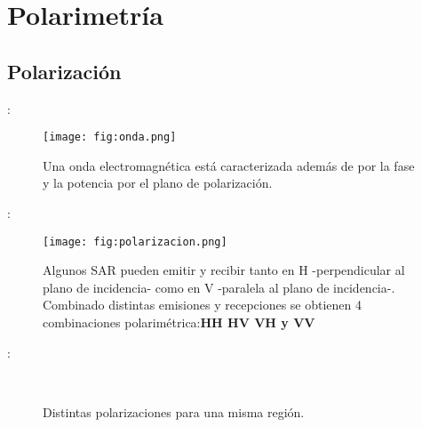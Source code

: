 \section{Polarimetría}
\subsection{Polarización}
\begin{frame}{\secname : \subsecname}
  \begin{figure}
    \centering
    \texttt{[image: fig:onda.png]}
    \caption{Una onda electromagnética está caracterizada además de por la fase y la potencia por el plano de polarización.}
    \label{}
  \end{figure}
\end{frame}

\begin{frame}{\secname : \subsecname}
  \begin{figure}
    \centering
    \texttt{[image: fig:polarizacion.png]}
    \caption{Algunos SAR pueden emitir y recibir tanto en H -perpendicular al plano de incidencia- como en V -paralela al plano de incidencia-. Combinado distintas emisiones y recepciones se obtienen 4 combinaciones polarimétrica:{\bf HH HV VH y VV}}
    \label{}
  \end{figure}
\end{frame}

\begin{frame}{\secname : \subsecname}
  \begin{figure}
    \centering
    \hspace{1cm}
    \\
    \hspace{1cm}
    \caption{Distintas polarizaciones para una misma región.}
  \end{figure}
\end{frame}

